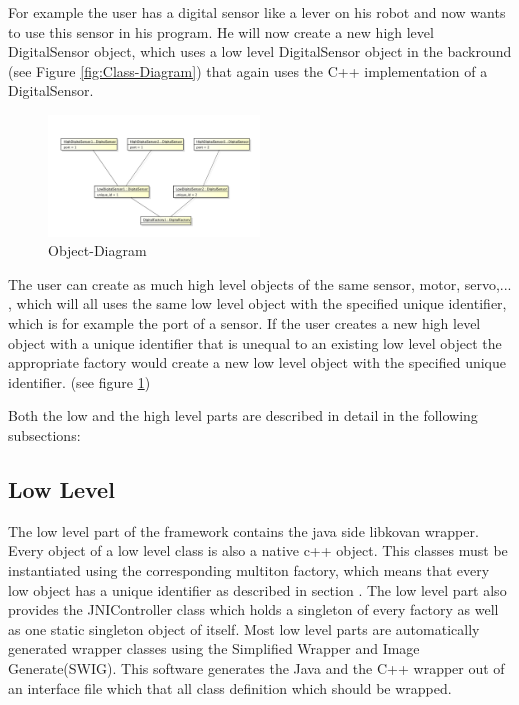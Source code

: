 \documentclass{juniorjournal}
\begin{document}
For example the user has a digital sensor like a lever on his robot and now 
wants to use this sensor in his program. He will now create a new high level 
DigitalSensor object, which uses a low level DigitalSensor object in the 
backround (see Figure \ref{fig:Class-Diagram}) that again uses the C++ implementation of a DigitalSensor.

\begin{figure}[H]
\centering
\includegraphics[width=0.5\textwidth]{images/Object-Diagram.pdf}
\caption{Object-Diagram}
\label{fig:Object-Diagram}
\end{figure}

The user can create as much high level objects of the same sensor, motor, 
servo,... , which will all uses the same low level object with the specified 
unique identifier, which is for example the port of a sensor. If the user 
creates a new high level object with a unique identifier that is unequal to 
an existing low level object the appropriate factory would 
create a new low level object with the specified unique identifier. (see figure \ref{fig:Object-Diagram})

Both the low and the high level parts are described in detail in the following subsections:

\subsection{Low Level}
The low level part of the framework contains the java side libkovan wrapper. 
Every object of a low level class is also a native c++ object.
This classes must be instantiated using the corresponding multiton factory, which means that every low object has a unique identifier as described in section .
The low level part also provides the JNIController class which holds a singleton of every factory as well as one static singleton object of itself.
Most low level parts are automatically generated wrapper classes using the Simplified Wrapper and Image Generate(SWIG).
This software generates the Java and the C++ wrapper out of an interface file which that all class definition which should be wrapped.
\end{document}
